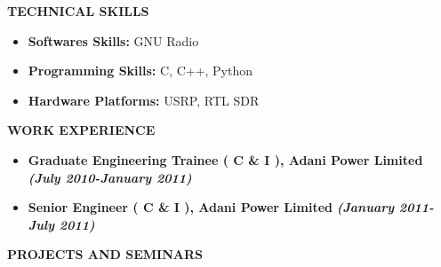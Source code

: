 \documentclass[a4paper,10pt]{article}
\begin{document}
 \colorbox{titleColor}{\parbox{6.5in}{\textbf{TECHNICAL SKILLS}}}
 \begin{itemize}
 \setlength{\itemsep}{1pt}
 \item \textbf{{Softwares Skills:}} GNU Radio
 \item \textbf{{Programming Skills:}} C, C++, Python
 \item \textbf{{Hardware Platforms:}} USRP, RTL SDR
 \end{itemize}

 \colorbox{titleColor}{\parbox{6.5in}{\textbf{WORK EXPERIENCE}}}

 \begin{itemize}
 \setlength{\itemsep}{1pt}
 \item \textbf{Graduate Engineering Trainee ( C \& I ), Adani Power Limited}  \textbf \emph{(July 2010-January 2011)}
 \item \textbf{Senior Engineer ( C \& I ), Adani Power Limited}  \textbf \emph{(January 2011-July 2011)}

\end{itemize}


 \colorbox{titleColor}{\parbox{6.5in}{\textbf{PROJECTS AND SEMINARS}}}
\end{document}
